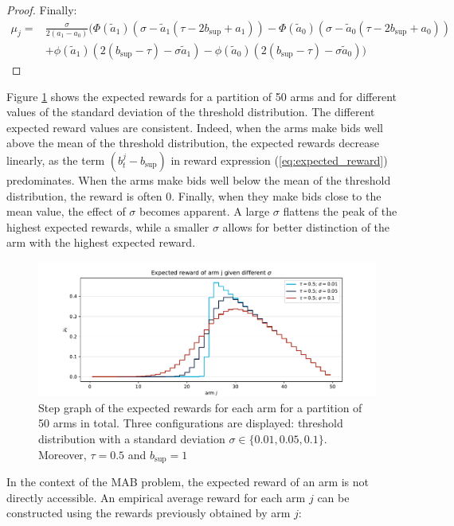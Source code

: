 \documentclass{statsmsc}
\begin{document}
\begin{proof}
Finally:
\begin{align*}
  \mu_j = &\frac{\sigma}{2(a_1 - a_0)}\biggl( \Phi\left(\tilde{a}_1\right) \left( \sigma - \tilde{a}_1\left(\tau - 2 b_{\sup} + a_1 \right)\right) - \Phi\left(\tilde{a}_0\right) \left( \sigma - \tilde{a}_0 \left(\tau - 2 b_{\sup} + a_0 \right)\right)\\
        &+ \phi\left(\tilde{a}_1\right)\left(  2 ( b_{\sup} - \tau)-\sigma \tilde{a}_1\right) - \phi\left(\tilde{a}_0\right)\left(  2 ( b_{\sup} - \tau)- \sigma \tilde{a}_0\right)\biggr)
\end{align*}
\end{proof}


Figure \ref{fig:exp-rew} shows the expected rewards for a partition of 50 arms and for different values of the standard deviation of the threshold distribution. 
The different expected reward values are consistent. Indeed, when the arms make bids well above the mean of the threshold distribution, the expected rewards decrease linearly, as the term $(b_t^{j} - b_{\sup})$ in reward expression (\ref{eq:expected_reward}) predominates.
When the arms make bids well below the mean of the threshold distribution, the reward is often 0.
Finally, when they make bids close to the mean value, the effect of $\sigma$ becomes apparent. A large $\sigma$ flattens the peak of the highest expected rewards, while a smaller $\sigma$ allows for better distinction of the arm with the highest expected reward.
\begin{figure}[htbp]
    \centering
    \includegraphics[width=\textwidth]{images/expect_rew_partition50.pdf}
    \caption{Step graph of the expected rewards for each arm for a partition of 50 arms in total. Three configurations are displayed: threshold distribution with a standard deviation $\sigma \in \{0.01, 0.05, 0.1\}$. Moreover, $\tau = 0.5$ and $b_{\sup} = 1$}
    \label{fig:exp-rew}
\end{figure}

In the context of the MAB problem, the expected reward of an arm is not directly accessible. An empirical average reward for each arm $j$ can be constructed using the rewards previously obtained by arm $j$:
\end{document}
